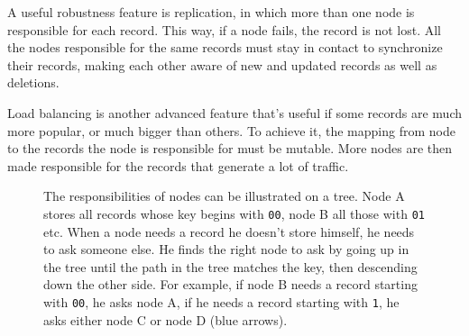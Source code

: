 A useful robustness feature is replication, in which more than one node is
responsible for each record. This way, if a node fails, the record is not lost.
All the nodes responsible for the same records must stay in contact to
synchronize their records, making each other aware of new and updated records as
well as deletions.

Load balancing is another advanced feature that's useful if some records are
much more popular, or much bigger than others. To achieve it, the mapping from
node to the records the node is responsible for must be mutable. More nodes are
then made responsible for the records that generate a lot of traffic.

\begin{figure}[t]
  \centering
  \caption{The responsibilities of nodes can be illustrated on a tree. Node A
  stores all records whose key begins with \texttt{00}, node B all those with
  \texttt{01} etc. When a node needs a record he doesn't store himself, he needs
  to ask someone else. He finds the right node to ask by going up in the tree
  until the path in the tree matches the key, then descending down the other
  side.  For example, if node B needs a record starting with \texttt{00}, he
  asks node A, if he needs a record starting with \texttt{1}, he asks either
  node C or node D (blue arrows).}
  \label{fig:node_id_tree}
\end{figure}

